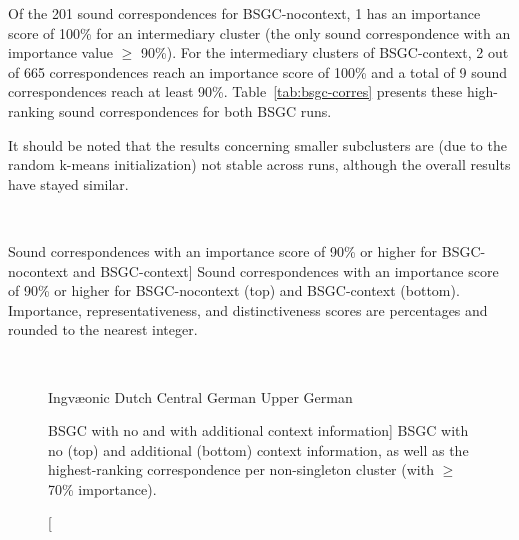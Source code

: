 \documentclass[a4paper]{article}
\def\upper{\color{purple}\FilledBigTriangleUp}
\def\central{\color{midblue}\FilledBigSquare}
\def\dutch{\color{green}\FilledBigCircle}
\def\ingv{\color{green}\BigCircle}
\begin{document}
Of the 201 sound correspondences for BSGC-nocontext,
1 has an importance score of 100\% for an intermediary cluster
(the only sound correspondence with an importance value $\geq$ 90\%).
For the intermediary clusters of BSGC-context, 2 out of 665 correspondences reach
an importance score of 100\% and
a total of 9 sound correspondences
reach at least 90\%.
Table~\ref{tab:bsgc-corres} presents these high-ranking
sound correspondences for both BSGC runs.

It should be noted that the results concerning smaller subclusters are
(due to the random k-means initialization) not stable
across runs, although the overall results have stayed similar.

\begin{table}[h]
\begin{adjustwidth}{-1cm}{-1cm}
\centering
\\
\vspace{1.5em}

\end{adjustwidth}
\caption
[Sound correspondences with an importance score
of 90\% or higher for BSGC-nocontext and BSGC-context]
{Sound correspondences with an importance score
of 90\% or higher for BSGC-nocontext (top) and BSGC-context (bottom).
Importance, representativeness, and distinctiveness scores are percentages
and rounded to the nearest integer.
}
\label{tab:bsgc-corres}
\end{table}

\begin{figure}[h]
\begin{adjustwidth}{-1.5cm}{-1cm}
\centering
\\
\vspace{1.5em}

\end{adjustwidth}

\vspace{0.5em}
\begin{center}
{\ingv} Ingv\ae{}onic \hspace{1em}
{\dutch} Dutch \hspace{1em}
{\central} Central German \hspace{1em}
{\upper} Upper German
\end{center}
\caption
[BSGC with no and with additional context information]
{BSGC with no (top) and additional (bottom) context information,
as well as the highest-ranking correspondence per non-singleton cluster
(with $\geq$70\% importance).}
\label{fig:bsgc-trees}
\end{figure}
\end{document}
